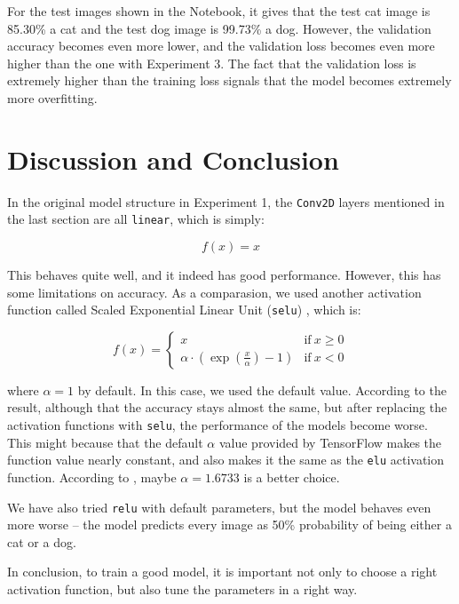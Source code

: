 \documentclass{article}
\begin{document}
For the test images shown in the Notebook, it gives that the test cat image is 85.30\% a cat and
the test dog image is 99.73\% a dog. However, the validation accuracy becomes even more lower,
and the validation loss becomes even more higher than the one with Experiment 3. The fact that the
validation loss is extremely higher than the training loss signals that the model becomes extremely
more overfitting.

\section*{Discussion and Conclusion}

In the original model structure in Experiment 1, the \texttt{Conv2D} layers mentioned in the last
section are all \texttt{linear}, which is simply:

\begin{equation}
  f(x) = x
\end{equation}

This behaves quite well, and it indeed has good performance. However, this has some
limitations on accuracy. As a comparasion, we used another activation function called Scaled
Exponential Linear Unit (\texttt{selu}) \cite{barron2017continuouslydifferentiableexponentiallinear},
which is:

\begin{equation}
  f(x) = \left\{ \begin{array}{cl}
    x & \text{if} \ x \geq 0 \\
    \alpha \cdot \left(\exp \left( \frac{x}{\alpha} \right) - 1 \right) & \text{if} \ x < 0
    \end{array} \right.
\end{equation}

where $ \alpha = 1 $ by default. In this case, we used the default value. According to the result,
although that the accuracy stays almost the same, but after replacing the activation functions
with \texttt{selu}, the performance of the models become worse. This might because that the default
$\alpha$ value provided by TensorFlow makes the function value nearly constant, and also makes it
the same as the \texttt{elu} activation function. According to
\cite{klambauer2017selfnormalizingneuralnetworks}, maybe $\alpha=1.6733$ is a better choice.

We have also tried \texttt{relu} with default parameters, but the model behaves even more worse --
the model predicts every image as 50\% probability of being either a cat or a dog.

In conclusion, to train a good model, it is important not only to choose a right activation function,
but also tune the parameters in a right way.



\end{document}
